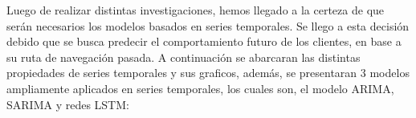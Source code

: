 Luego de realizar distintas investigaciones, hemos llegado a la certeza de que serán necesarios los modelos basados en series temporales. Se llego a esta decisión debido que se busca predecir el comportamiento futuro de los clientes, en base a su ruta de navegación pasada. A continuación se abarcaran las distintas propiedades de series temporales y sus graficos, además, se presentaran 3 modelos ampliamente aplicados en series temporales, los cuales son, el modelo ARIMA, SARIMA y redes LSTM:
